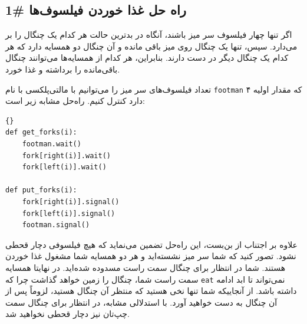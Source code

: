 \documentclass{book}
\begin{document}
\subsection{راه حل غذا خوردن فیلسوف‌ها  \#1}

    اگر تنها چهار فیلسوف سر میز باشند، آنگاه در بدترین حالت هر کدام یک چنگال را بر می‌دارد. سپس، تنها یک چنگال روی میز باقی‌ مانده و 
    آن چنگال دو همسایه دارد که هر کدام یک چنگال دیگر در دست دارند. بنابراین، هر کدام از همسایه‌ها می‌توانند چنگال باقی‌مانده را برداشته و غذا خورد. 

    تعداد فیلسوف‌های سر میز را می‌توانیم با مالتی‌پلکسی با نام {\tt footman} که مقدار اولیه ۴ دارد کنترل کنیم. 
    راه‌حل مشابه زیر است: 

\begin{latin}
\begin{lstlisting}[title=\rl{راه حل غذا خوردن فیلسوف‌ها \#1}]{}
def get_forks(i):
    footman.wait()
    fork[right(i)].wait()
    fork[left(i)].wait()

def put_forks(i):
    fork[right(i)].signal()
    fork[left(i)].signal()
    footman.signal()
\end{lstlisting}
\end{latin}

    علاوه بر اجتناب از بن‌بست، این راه‌حل تضمین می‌نماید که هیچ فیلسوفی دچار قحطی نشود. 
    تصور کنید که شما سر میز نشسته‌اید و هر دو همسایه شما مشغول غذا خوردن هستند. 
    شما در انتظار برای چنگال سمت راست مسدوده شده‌اید. در نهایتا همسایه سمت راست شما، چنگال را زمین خواهد گذاشت چرا که  {\tt eat} 
    نمی‌تواند تا ابد ادامه داشته باشد. از آنجاییکه شما تنها نخی هستید که منتظر آن چنگال هستید، لزوماً پس از آن چنگال به دست خواهید آورد. 
    با استدلالی مشابه، در انتظار برای چنگال سمت چپ‌تان نیز دچار قحطی نخواهید شد. 
    
\end{document}
